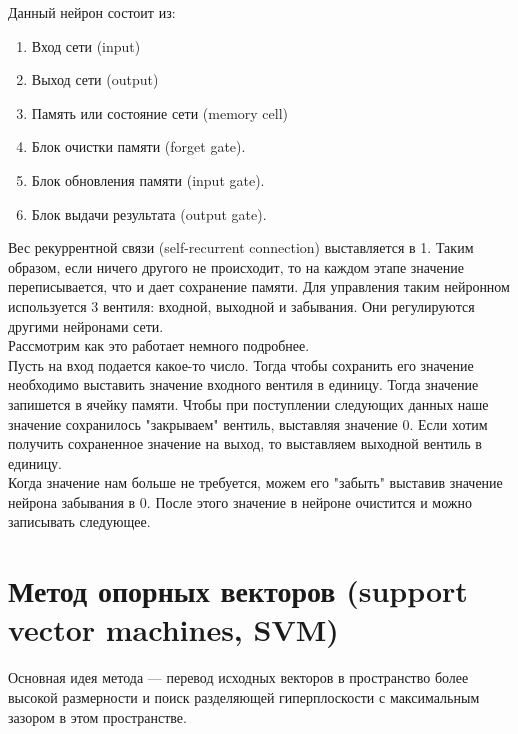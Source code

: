 \documentclass[paper=a4, fontsize=11pt]{scrartcl} %
\numberwithin{equation}{section} %
\numberwithin{figure}{section} %
\numberwithin{table}{section} %
\begin{document}
	Данный нейрон состоит из:
	
	\begin{enumerate}
	\item Вход сети (input)
	\item Выход сети (output)
	\item Память или состояние сети (memory cell)
	\item Блок очистки памяти (forget gate).
	\item Блок обновления памяти (input gate).
	\item Блок выдачи результата (output gate).
	\end{enumerate}
	
	Вес рекуррентной связи (self-recurrent connection) выставляется в 1. Таким образом, если ничего другого не происходит, то на каждом этапе значение переписывается, что и дает сохранение памяти. Для управления таким нейронном используется 3 вентиля: входной, выходной и забывания. Они регулируются другими нейронами сети. \\
	Рассмотрим как это работает немного подробнее.  \\
	Пусть на вход подается какое-то число. Тогда чтобы сохранить его значение необходимо выставить значение входного вентиля в единицу. Тогда значение запишется в ячейку памяти. Чтобы при поступлении следующих данных наше значение сохранилось "закрываем" вентиль, выставляя значение 0. Если хотим получить сохраненное значение на выход, то выставляем выходной вентиль в единицу.  \\
	Когда значение нам больше не требуется, можем его "забыть" выставив значение нейрона забывания в 0. После этого значение в нейроне очистится и можно записывать следующее.
	
	
	\section{Метод опорных векторов (support vector machines, SVM)}
	
	Основная идея метода — перевод исходных векторов в пространство более высокой размерности и поиск разделяющей гиперплоскости с максимальным зазором в этом пространстве.
	
\end{document}
